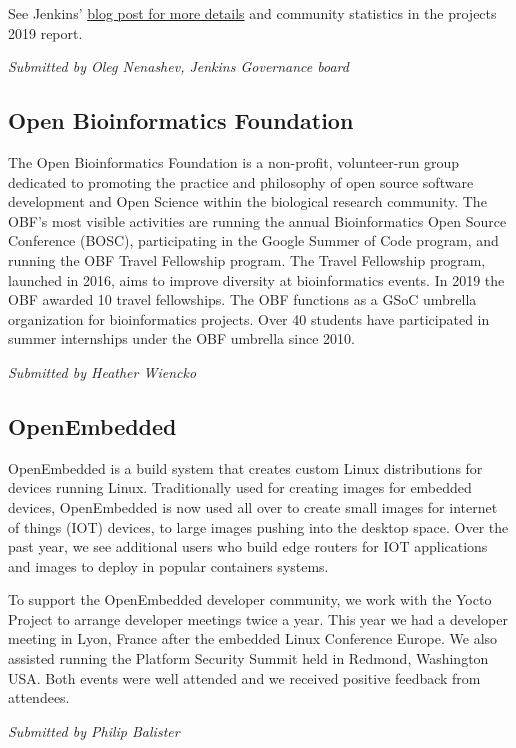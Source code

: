\documentclass[a4paper]{report}
\begin{document}
See Jenkins'
\href{https://jenkins.io/blog/2020/01/07/happy-new-year/}{blog post for
more details} and community statistics in the projects 2019 report.

{\em Submitted by Oleg Nenashev, Jenkins Governance board}

\subsection{Open Bioinformatics Foundation}

The Open Bioinformatics Foundation is a non-profit, volunteer-run group
dedicated to promoting the practice and philosophy of open source
software development and Open Science within the biological research
community. The OBF's most visible activities are running the annual
Bioinformatics Open Source Conference (BOSC), participating in the
Google Summer of Code program, and running the OBF Travel Fellowship
program. The Travel Fellowship program, launched in 2016, aims to
improve diversity at bioinformatics events. In 2019 the OBF awarded 10
travel fellowships. The OBF functions as a GSoC umbrella organization
for bioinformatics projects.  Over 40 students have participated in
summer internships under the OBF umbrella since 2010.

{\em Submitted by Heather Wiencko}

\subsection{OpenEmbedded}

OpenEmbedded is a build system that creates custom Linux distributions
for devices running Linux. Traditionally used for creating images for
embedded devices, OpenEmbedded is now used all over to create small
images for internet of things (IOT) devices, to large images pushing
into the desktop space.  Over the past year, we see additional users who
build edge routers for IOT applications and images to deploy in popular
containers systems.

To support the OpenEmbedded developer community, we work with the Yocto
Project to arrange developer meetings twice a year. This year we had a
developer meeting in Lyon, France after the embedded Linux Conference
Europe. We also assisted running the Platform Security Summit held in
Redmond, Washington USA. Both events were well attended and we received
positive feedback from attendees.

{\em Submitted by Philip Balister}
\end{document}
